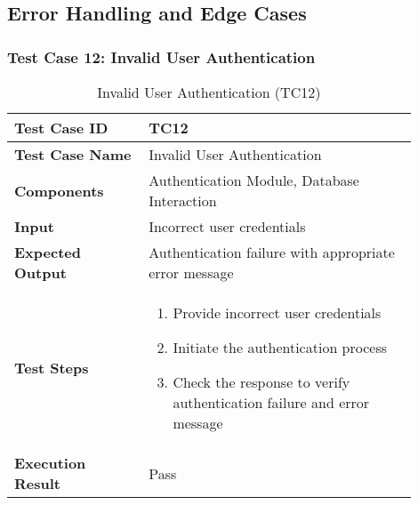 \pagebreak
\subsection{Error Handling and Edge Cases}


\begin{table}[h]
	\subsubsection{Test Case 12: Invalid User Authentication}
	\centering
	\caption{Invalid User Authentication (TC12)}
	\begin{tabular}{|p{0.3\linewidth}|p{0.6\linewidth}|}
		\hline
		\textbf{Test Case ID} & TC12 \\
		\hline
		\textbf{Test Case Name} & Invalid User Authentication \\
		\hline
		\textbf{Components} & Authentication Module, Database Interaction \\
		\hline
		\textbf{Input} & Incorrect user credentials \\
		\hline
		\textbf{Expected Output} & Authentication failure with appropriate error message \\
		\hline
		\textbf{Test Steps} & 
		\begin{enumerate}
			\item Provide incorrect user credentials
			\item Initiate the authentication process
			\item Check the response to verify authentication failure and error message
		\end{enumerate} \\
		\hline
		\textbf{Execution Result} & Pass \\
		\hline
	\end{tabular}
\end{table}

